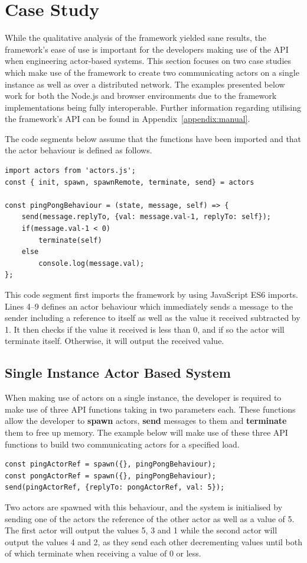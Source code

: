 \documentclass[oneside]{um-fict}
\begin{document}
\section{Case Study}
While the qualitative analysis of the framework yielded sane results, the framework's ease of use is important for the developers making use of the API when engineering actor-based systems. This section focuses on two case studies which make use of the framework to create two communicating actors on a single instance as well as over a distributed network. The examples presented below work for both the Node.js and browser environments due to the framework implementations being fully interoperable. Further information regarding utilising the framework's API can be found in Appendix~\ref{appendix:manual}.

The code segments below assume that the functions have been imported and that the actor behaviour is defined as follows.
\begin{lstlisting}    
import actors from 'actors.js';
const { init, spawn, spawnRemote, terminate, send} = actors

const pingPongBehaviour = (state, message, self) => {
    send(message.replyTo, {val: message.val-1, replyTo: self});
    if(message.val-1 < 0)
        terminate(self)
    else    
        console.log(message.val);
};
\end{lstlisting}
This code segment first imports the framework by using JavaScript ES6 imports. Lines 4--9 defines an actor behaviour which immediately sends a message to the sender including a reference to itself as well as the value it received subtracted by 1. It then checks if the value it received is less than 0, and if so the actor will terminate itself. Otherwise, it will output the received value. 
\subsection{Single Instance Actor Based System}
When making use of actors on a single instance, the developer is required to make use of three API functions taking in two parameters each. These functions allow the developer to \textbf{spawn} actors, \textbf{send} messages to them and \textbf{terminate} them to free up memory. The example below will make use of these three API functions to build two communicating actors for a specified load.
\begin{lstlisting}    
const pingActorRef = spawn({}, pingPongBehaviour);
const pongActorRef = spawn({}, pingPongBehaviour);
send(pingActorRef, {replyTo: pongActorRef, val: 5});
\end{lstlisting}
Two actors are spawned with this behaviour, and the system is initialised by sending one of the actors the reference of the other actor as well as a value of 5. The first actor will output the values 5, 3 and 1 while the second actor will output the values 4 and 2, as they send each other decrementing values until both of which terminate when receiving a value of 0 or less.
\end{document}
